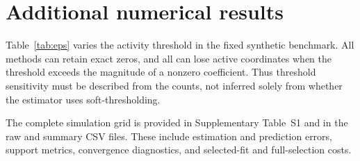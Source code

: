 \section{Additional numerical results}
\label{app:extra}

Table~\ref{tab:eps} varies the activity threshold in the fixed synthetic
benchmark. All methods can retain exact zeros, and all can lose active
coordinates when the threshold exceeds the magnitude of a nonzero
coefficient. Thus threshold sensitivity must be described from the counts,
not inferred solely from whether the estimator uses soft-thresholding.



The complete simulation grid is provided in Supplementary Table~S1 and in
the raw and summary CSV files. These include estimation and prediction
errors, support metrics, convergence diagnostics, and selected-fit and
full-selection costs.
